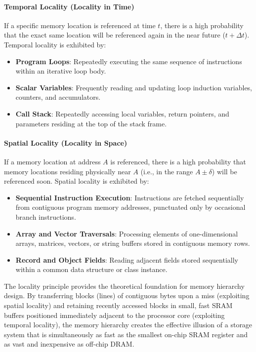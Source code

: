 \paragraph{Temporal Locality (Locality in Time)}
If a specific memory location is referenced at time $t$, there is a high probability that the exact same location will be referenced again in the near future ($t + \Delta t$).
Temporal locality is exhibited by:
\begin{itemize}
    \item \textbf{Program Loops}: Repeatedly executing the same sequence of instructions within an iterative loop body.
    \item \textbf{Scalar Variables}: Frequently reading and updating loop induction variables, counters, and accumulators.
    \item \textbf{Call Stack}: Repeatedly accessing local variables, return pointers, and parameters residing at the top of the stack frame.
\end{itemize}

\paragraph{Spatial Locality (Locality in Space)}
If a memory location at address $A$ is referenced, there is a high probability that memory locations residing physically near $A$ (i.e., in the range $A \pm \delta$) will be referenced soon.
Spatial locality is exhibited by:
\begin{itemize}
    \item \textbf{Sequential Instruction Execution}: Instructions are fetched sequentially from contiguous program memory addresses, punctuated only by occasional branch instructions.
    \item \textbf{Array and Vector Traversals}: Processing elements of one-dimensional arrays, matrices, vectors, or string buffers stored in contiguous memory rows.
    \item \textbf{Record and Object Fields}: Reading adjacent fields stored sequentially within a common data structure or class instance.
\end{itemize}

The locality principle provides the theoretical foundation for memory hierarchy design. By transferring blocks (lines) of contiguous bytes upon a miss (exploiting spatial locality) and retaining recently accessed blocks in small, fast SRAM buffers positioned immediately adjacent to the processor core (exploiting temporal locality), the memory hierarchy creates the effective illusion of a storage system that is simultaneously as fast as the smallest on-chip SRAM register and as vast and inexpensive as off-chip DRAM.

